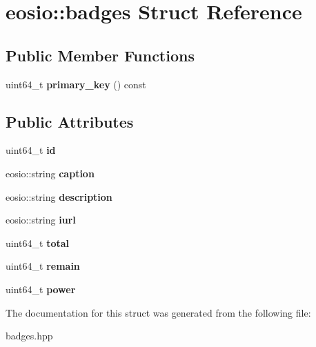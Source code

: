 \hypertarget{structeosio_1_1badges}{}\section{eosio\+:\+:badges Struct Reference}
\label{structeosio_1_1badges}
\subsection*{Public Member Functions}
\begin{DoxyCompactItemize}
\item 
\mbox{\label{structeosio_1_1badges_a4ce3a0e92e27d9ff173990df5762eb60}} 
uint64\+\_\+t {\bfseries primary\+\_\+key} () const
\end{DoxyCompactItemize}
\subsection*{Public Attributes}
\begin{DoxyCompactItemize}
\item 
\mbox{\label{structeosio_1_1badges_a89b3ce5ce0f480c3f811c0e6ae31aac8}} 
uint64\+\_\+t {\bfseries id}
\item 
\mbox{\label{structeosio_1_1badges_a891b1c8798996eeaebfb0ee962e48e72}} 
eosio\+::string {\bfseries caption}
\item 
\mbox{\label{structeosio_1_1badges_a5660dc2a36d1aafe0fe11e976b264e9c}} 
eosio\+::string {\bfseries description}
\item 
\mbox{\label{structeosio_1_1badges_a7338d05cac1d40b12a31a372252e4be2}} 
eosio\+::string {\bfseries iurl}
\item 
\mbox{\label{structeosio_1_1badges_ade9193e2fd897844f2ec2297c33c5056}} 
uint64\+\_\+t {\bfseries total}
\item 
\mbox{\label{structeosio_1_1badges_a434cacbcfcac81b18ae18183dcd1d366}} 
uint64\+\_\+t {\bfseries remain}
\item 
\mbox{\label{structeosio_1_1badges_a5a5b41dae3374fde91b1f0fc8b3d5af8}} 
uint64\+\_\+t {\bfseries power}
\end{DoxyCompactItemize}


The documentation for this struct was generated from the following file\+:\begin{DoxyCompactItemize}
\item 
badges.\+hpp\end{DoxyCompactItemize}
